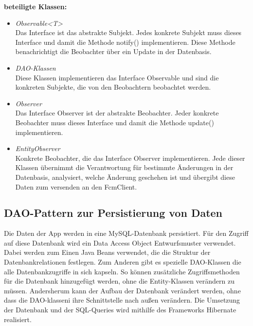 \textbf{beteiligte Klassen:}
\begin{itemize}
	\item \textit{Observable<T>}\\ Das Interface ist das abstrakte Subjekt. Jedes konkrete Subjekt muss dieses Interface und damit die Methode notify() implementieren. Diese Methode benachrichtigt die Beobachter über ein Update in der Datenbasis.
	\item \textit{DAO-Klassen}\\ Diese Klassen implementieren das Interface Observable und sind die konkreten Subjekte, die von den Beobachtern beobachtet werden.
	\item \textit{Observer}\\ Das Interface Observer ist der abstrakte Beobachter. Jeder konkrete Beobachter muss dieses Interface und damit die Methode update() implementieren.
	\item \textit{EntityObserver}\\Konkrete Beobachter, die das Interface Observer implementieren. Jede dieser Klassen übernimmt die Verantwortung für bestimmte Änderungen in der Datenbasis, analysiert, welche Änderung geschehen ist und übergibt diese Daten zum versenden an den FcmClient.
\end{itemize}

\subsection{DAO-Pattern zur Persistierung von Daten}
Die Daten der App werden in eine MySQL-Datenbank persistiert. Für den Zugriff auf diese Datenbank wird ein Data Access Object Entwurfsmuster verwendet. Dabei werden zum Einen Java Beans verwendet, die die Struktur der Datenbankrelationen festlegen. Zum Anderen gibt es spezielle DAO-Klassen die alle Datenbankzugriffe in sich kapseln. So können zusätzliche Zugriffsmethoden für die Datenbank hinzugefügt werden, ohne die Entity-Klassen verändern zu müssen. Andersherum kann der Aufbau der Datenbank verändert werden, ohne dass die DAO-klasseni ihre Schnittstelle nach außen verändern.
Die Umsetzung der Datenbank und der SQL-Queries wird mithilfe des Frameworks Hibernate realisiert.\\


